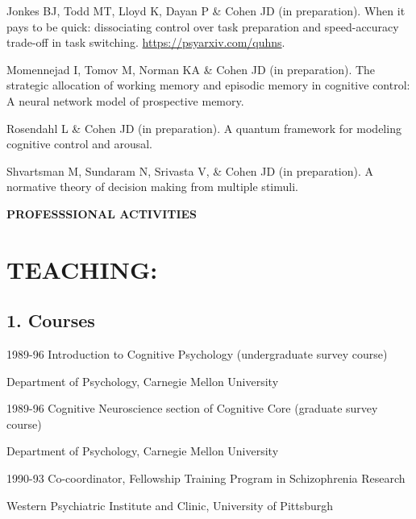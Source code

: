 \documentclass[10 pt]{article}
\begin{document}
Jonkes BJ, Todd MT, Lloyd K, Dayan P \& Cohen JD (in preparation). When it pays to be quick: dissociating control
over task preparation and speed-accuracy trade-off in task switching. \href{https://psyarxiv.com/quhns}{https://psyarxiv.com/quhns}.

Momennejad I, Tomov M, Norman KA \& Cohen JD (in preparation). The strategic allocation of working memory and episodic memory in cognitive control: A neural network model of prospective memory.

Rosendahl L \& Cohen JD (in preparation). A quantum framework for modeling cognitive control and arousal.

Shvartsman M, Sundaram N, Srivasta V, \& Cohen JD (in preparation). A normative theory of decision making from multiple stimuli.

    \newpage


    \begin{center}
{\fontsize{15pt}{16 pt}\selectfont \textbf{PROFESSSIONAL ACTIVITIES}}
    \end{center}

\section*{TEACHING:} \label{secTEACHING}
    \smallskip

\subsection*{1. Courses} \label{secTEACHING1}
    \medskip

1989-96 \hspace{0.3in} Introduction to Cognitive Psychology (undergraduate survey course)

\hspace{0.81in} Department of Psychology, Carnegie Mellon University
    \smallskip

1989-96 \hspace{0.3in} Cognitive Neuroscience section of Cognitive Core (graduate survey course)

\hspace{0.81in} Department of Psychology, Carnegie Mellon University
    \smallskip

1990-93 \hspace{0.3in} Co-coordinator, Fellowship Training Program in Schizophrenia Research

\hspace{0.81in} Western Psychiatric Institute and Clinic, University of Pittsburgh
    \smallskip
\end{document}
